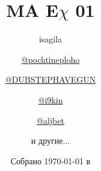 \title{\huge \textbf{MA E\(\chi\) 01}}
\author{
	isagila
  \and
  \href{https://t.me/pochtineploho}{@pochtineploho}
  \and
  \href{https://t.me/DUBSTEPHAVEGUN}{@DUBSTEPHAVEGUN}
  \and
  \href{https://t.me/i9kin}{@i9kin}
  \and
  \href{https://t.me/aljbet}{@aljbet}
  \and
  и другие\(\dotsc\)
}
\date{Собрано {\ddmmyyyydate\today} в \currenttime}
\newcommand{\githublink}{https://github.com/isagila/tesc}
